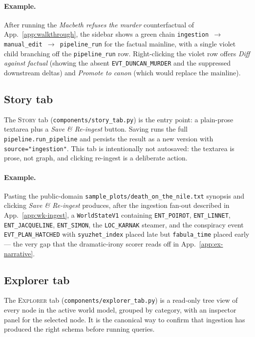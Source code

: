 \documentclass[11pt]{article}
\begin{document}
\paragraph{Example.} After running the
\emph{Macbeth refuses the murder} counterfactual of
App.~\ref{app:walkthrough}, the sidebar shows a green chain
\texttt{ingestion $\to$ manual\_edit $\to$ pipeline\_run} for the
factual mainline, with a single violet child branching off the
\texttt{pipeline\_run} row. Right-clicking the violet row offers
\emph{Diff against factual} (showing the absent
\texttt{EVT\_DUNCAN\_MURDER} and the suppressed downstream
deltas) and \emph{Promote to canon} (which would replace the
mainline).

\subsection{Story tab}
\label{app:ui-story}

The \textsc{Story} tab
(\texttt{components/story\_tab.py}) is the entry point: a
plain-prose textarea plus a \emph{Save \& Re-ingest} button.
Saving runs the full \texttt{pipeline.run\_pipeline} and persists
the result as a new version with \texttt{source="ingestion"}. This
tab is intentionally not autosaved: the textarea is prose, not
graph, and clicking re-ingest is a deliberate action.

\paragraph{Example.} Pasting the public-domain
\texttt{sample\_plots/death\_on\_the\_nile.txt} synopsis and
clicking \emph{Save \& Re-ingest} produces, after the ingestion
fan-out described in App.~\ref{app:wk-ingest}, a
\texttt{WorldStateV1} containing
\texttt{ENT\_POIROT}, \texttt{ENT\_LINNET},
\texttt{ENT\_JACQUELINE}, \texttt{ENT\_SIMON}, the
\texttt{LOC\_KARNAK} steamer, and the conspiracy event
\texttt{EVT\_PLAN\_HATCHED} with \texttt{syuzhet\_index} placed
late but \texttt{fabula\_time} placed early --- the very gap that
the dramatic-irony scorer reads off in
App.~\ref{app:ex-narrative}.

\subsection{Explorer tab}
\label{app:ui-explorer}

The \textsc{Explorer} tab
(\texttt{components/explorer\_tab.py}) is a read-only tree view
of every node in the active world model, grouped by category, with
an inspector panel for the selected node. It is the canonical way
to confirm that ingestion has produced the right schema before
running queries.
\end{document}
